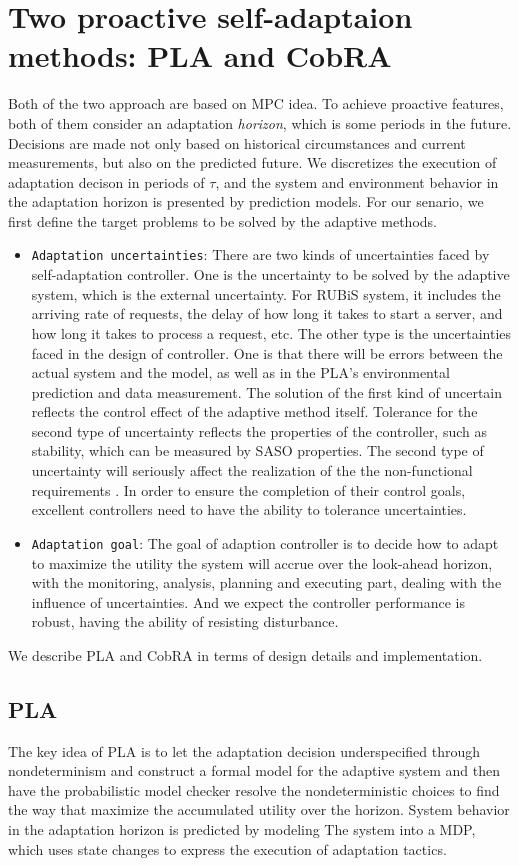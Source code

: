 \documentclass[sigconf]{acmart}
\begin{document}
\section{Two proactive self-adaptaion methods: PLA and CobRA}
Both of the two approach are based on MPC\cite{mpc} idea. To achieve proactive features, both of them consider an adaptation \textit{horizon}, which is some periods in the future. Decisions are made not only based on historical circumstances and current measurements, but also on the predicted future. We discretizes the execution of adaptation decison in periods of $\tau$, and the system and environment behavior in the adaptation horizon is presented by prediction models. For our senario, we first define the target problems to be solved by the adaptive methods. 
\begin{itemize}
	\item {\verb|Adaptation uncertainties|}:
	There are two kinds of uncertainties faced by self-adaptation controller. One is the uncertainty to be solved by the adaptive system, which is the external uncertainty. For RUBiS system, it includes the arriving rate of requests, the delay of how long it takes to start a server, and how long it takes to process a request, etc. The other type is the uncertainties faced in the design of controller. One is that there will be errors between the actual system and the model, as well as in the PLA's environmental prediction and data measurement.
	The solution of the first kind of uncertain reflects the control effect of the adaptive method itself.
	Tolerance for the second type of uncertainty reflects the properties of the controller, such as stability, which can be measured by SASO properties\cite{saso}.
	The second type of uncertainty will seriously affect the realization of the the non-functional requirements . In order to ensure the completion of their control goals, excellent controllers need to have the ability to tolerance uncertainties.
	\item {\verb|Adaptation goal|}:
	The goal of adaption controller is to decide how to adapt to maximize the utility the system will accrue over the look-ahead horizon, with the monitoring, analysis, planning and executing part, dealing with the influence of uncertainties. And we expect the controller performance is robust, having the ability of resisting disturbance.
\end{itemize}
We describe PLA and CobRA in terms of design details and implementation.
\subsection{PLA}
The key idea of PLA is to let the adaptation decision underspecified through nondeterminism and construct a formal model for the adaptive system and then have the probabilistic model checker resolve the nondeterministic choices to find the way that maximize the accumulated utility over the horizon\cite{pla}. System behavior in the adaptation horizon is predicted by modeling The system into a MDP\cite{mdp}, which uses state changes to express the execution of adaptation tactics. 
\end{document}
